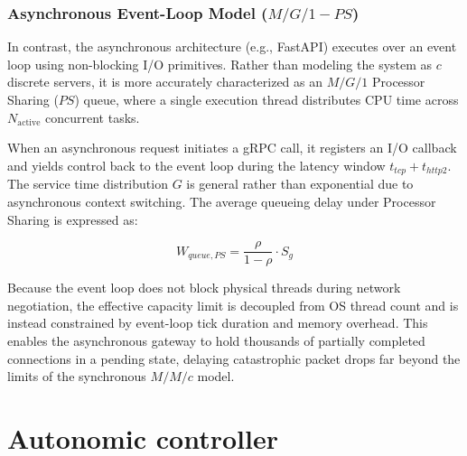 \documentclass{ieeeaccess}
\begin{document}
\subsubsection{Asynchronous Event-Loop Model ($M/G/1-PS$)}
In contrast, the asynchronous architecture (e.g., FastAPI) executes over an event loop using non-blocking I/O primitives. Rather than modeling the system as $c$ discrete servers, it is more accurately characterized as an $M/G/1$ Processor Sharing ($PS$) queue, where a single execution thread distributes CPU time across $N_{\text{active}}$ concurrent tasks.

When an asynchronous request initiates a gRPC call, it registers an I/O callback and yields control back to the event loop during the latency window $t_{tcp} + t_{http2}$. The service time distribution $G$ is general rather than exponential due to asynchronous context switching. The average queueing delay under Processor Sharing is expressed as:

\begin{equation}
	W_{queue, PS} = \frac{\rho}{1 - \rho} \cdot S_{g}
\end{equation}

Because the event loop does not block physical threads during network negotiation, the effective capacity limit is decoupled from OS thread count and is instead constrained by event-loop tick duration and memory overhead. This enables the asynchronous gateway to hold thousands of partially completed connections in a pending state, delaying catastrophic packet drops far beyond the limits of the synchronous $M/M/c$ model.

\section{Autonomic controller}
\label{sec3}
\end{document}

